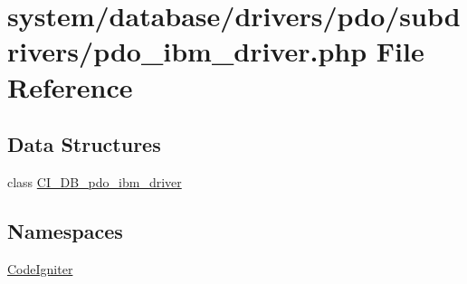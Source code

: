 \hypertarget{pdo__ibm__driver_8php}{}\section{system/database/drivers/pdo/subdrivers/pdo\+\_\+ibm\+\_\+driver.php File Reference}
\label{pdo__ibm__driver_8php}
\subsection*{Data Structures}
\begin{DoxyCompactItemize}
\item 
class \mbox{\hyperlink{class_c_i___d_b__pdo__ibm__driver}{C\+I\+\_\+\+D\+B\+\_\+pdo\+\_\+ibm\+\_\+driver}}
\end{DoxyCompactItemize}
\subsection*{Namespaces}
\begin{DoxyCompactItemize}
\item 
 \mbox{\hyperlink{namespace_code_igniter}{Code\+Igniter}}
\end{DoxyCompactItemize}
